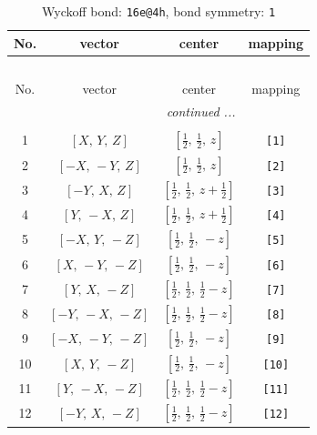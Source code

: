 \documentclass[fleqn,8pt]{jsarticle}
\begin{document}
\begin{longtable}{cccc}
\caption{Wyckoff bond: {\tt 16e@4h}, bond symmetry: {\tt 1}}
 \\
 \hline \hline
No. & vector & center & mapping \\ \hline \endfirsthead

\multicolumn{3}{l}{\tablename\ \thetable{}} \\
 \hline \hline
No. & vector & center & mapping \\ \hline \endhead

 \hline \hline
\multicolumn{3}{r}{\footnotesize\it continued ...} \\ \endfoot

 \hline \hline
\multicolumn{3}{r}{} \\ \endlastfoot

1 & $\left[ X,\, Y,\, Z \right]$ & $\left[ \frac{1}{2},\, \frac{1}{2},\, z \right]$ & {\tt [1]} \\ \hline
2 & $\left[ - X,\, - Y,\, Z \right]$ & $\left[ \frac{1}{2},\, \frac{1}{2},\, z \right]$ & {\tt [2]} \\ \hline
3 & $\left[ - Y,\, X,\, Z \right]$ & $\left[ \frac{1}{2},\, \frac{1}{2},\, z + \frac{1}{2} \right]$ & {\tt [3]} \\ \hline
4 & $\left[ Y,\, - X,\, Z \right]$ & $\left[ \frac{1}{2},\, \frac{1}{2},\, z + \frac{1}{2} \right]$ & {\tt [4]} \\ \hline
5 & $\left[ - X,\, Y,\, - Z \right]$ & $\left[ \frac{1}{2},\, \frac{1}{2},\, - z \right]$ & {\tt [5]} \\ \hline
6 & $\left[ X,\, - Y,\, - Z \right]$ & $\left[ \frac{1}{2},\, \frac{1}{2},\, - z \right]$ & {\tt [6]} \\ \hline
7 & $\left[ Y,\, X,\, - Z \right]$ & $\left[ \frac{1}{2},\, \frac{1}{2},\, \frac{1}{2} - z \right]$ & {\tt [7]} \\ \hline
8 & $\left[ - Y,\, - X,\, - Z \right]$ & $\left[ \frac{1}{2},\, \frac{1}{2},\, \frac{1}{2} - z \right]$ & {\tt [8]} \\ \hline
9 & $\left[ - X,\, - Y,\, - Z \right]$ & $\left[ \frac{1}{2},\, \frac{1}{2},\, - z \right]$ & {\tt [9]} \\ \hline
10 & $\left[ X,\, Y,\, - Z \right]$ & $\left[ \frac{1}{2},\, \frac{1}{2},\, - z \right]$ & {\tt [10]} \\ \hline
11 & $\left[ Y,\, - X,\, - Z \right]$ & $\left[ \frac{1}{2},\, \frac{1}{2},\, \frac{1}{2} - z \right]$ & {\tt [11]} \\ \hline
12 & $\left[ - Y,\, X,\, - Z \right]$ & $\left[ \frac{1}{2},\, \frac{1}{2},\, \frac{1}{2} - z \right]$ & {\tt [12]} \\ \hline

\end{longtable}
\end{document}
